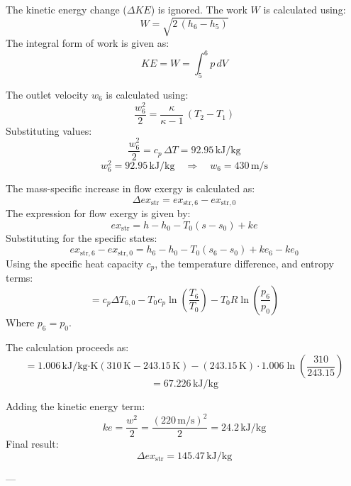 The kinetic energy change (\( \Delta KE \)) is ignored. The work \( W \) is calculated using:  
\[
W = \sqrt{2 \, (h_6 - h_5)}
\]  
The integral form of work is given as:  
\[
KE = W = \int_{5}^{6} p \, dV
\]  

The outlet velocity \( w_6 \) is calculated using:  
\[
\frac{w_6^2}{2} = \frac{\kappa}{\kappa - 1} \, (T_2 - T_1)
\]  
Substituting values:  
\[
\frac{w_6^2}{2} = c_p \, \Delta T = 92.95 \, \text{kJ/kg}
\]  
\[
w_6^2 = 92.95 \, \text{kJ/kg} \quad \Rightarrow \quad w_6 = 430 \, \text{m/s}
\]

The mass-specific increase in flow exergy is calculated as:  
\[
\Delta ex_{\text{str}} = ex_{\text{str},6} - ex_{\text{str},0}
\]  
The expression for flow exergy is given by:  
\[
ex_{\text{str}} = h - h_0 - T_0 (s - s_0) + ke
\]  
Substituting for the specific states:  
\[
ex_{\text{str},6} - ex_{\text{str},0} = h_6 - h_0 - T_0 (s_6 - s_0) + ke_6 - ke_0
\]  
Using the specific heat capacity \( c_p \), the temperature difference, and entropy terms:  
\[
= c_p \Delta T_{6,0} - T_0 c_p \ln \left( \frac{T_6}{T_0} \right) - T_0 R \ln \left( \frac{p_6}{p_0} \right)
\]  
Where \( p_6 = p_0 \).  

The calculation proceeds as:  
\[
= 1.006 \, \text{kJ/kg·K} \left( 310 \, \text{K} - 243.15 \, \text{K} \right) - (243.15 \, \text{K}) \cdot 1.006 \ln \left( \frac{310}{243.15} \right)
\]  
\[
= 67.226 \, \text{kJ/kg}
\]  

Adding the kinetic energy term:  
\[
ke = \frac{w^2}{2} = \frac{(220 \, \text{m/s})^2}{2} = 24.2 \, \text{kJ/kg}
\]  
Final result:  
\[
\Delta ex_{\text{str}} = 145.47 \, \text{kJ/kg}
\]  

---